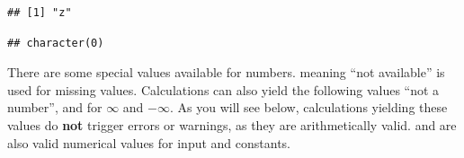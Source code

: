 \documentclass[krantz2]{krantz}\usepackage{knitr}
\begin{document}
\begin{knitrout}\footnotesize
{}\color{fgcolor}\begin{kframe}
\begin{alltt}
\hlstd{(}\hlstd{=}\hlstd{)}
\end{alltt}
\begin{verbatim}
## [1] "z"
\end{verbatim}
\begin{alltt}
\hlstd{(}\hlstd{=}\hlstd{)}
\end{alltt}
\begin{verbatim}
## character(0)
\end{verbatim}
\end{kframe}
\end{knitrout}

There\label{par:special:values} are some special values available for numbers.  meaning ``not available'' is used for missing values. Calculations can also yield the following values  ``not a number'',  and  for $\infty$ and $-\infty$. As you will see below, calculations yielding these values do \textbf{not} trigger errors or warnings, as they are arithmetically valid.  and  are also valid numerical values for input and constants.
\end{document}
